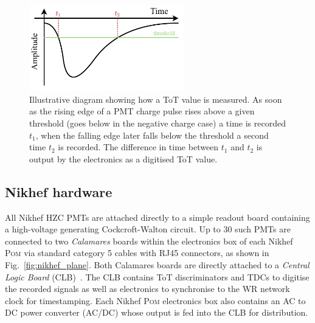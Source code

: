 \begin{figure} %
    \includegraphics[width=0.6\textwidth]{diagrams/5-daq/tot.pdf}
    \caption[Illustrative diagram showing how Time over Threshold is measured.]
    {Illustrative diagram showing how a ToT value is measured. As soon as the rising edge of a PMT
        charge pulse rises above a given threshold (goes below in the negative charge case) a time
        is recorded $t_{1}$, when the falling edge later falls below the threshold a second time
        $t_{2}$ is recorded. The difference in time between $t_{1}$ and $t_{2}$ is output by the
        electronics as a digitised ToT value.}
    \label{fig:tot}
\end{figure}

\subsection{Nikhef hardware} %
\label{sec:daq_hard_Nikhed} %

All Nikhef HZC PMTs are attached directly to a simple readout board containing a high-voltage
generating Cockcroft-Walton circuit. Up to 30 such PMTs are connected to two \emph{Calamares}
boards within the electronics box of each Nikhef \textsc{Pom} via standard category 5 cables with
RJ45 connectors, as shown in Fig.~\ref{fig:nikhef_plane}. Both Calamares boards are directly
attached to a \emph{Central Logic Board} (CLB)~\cite{biagi2015, eijk2015}. The CLB contains ToT
discriminators and TDCs to digitise the recorded signals as well as electronics to synchronise to
the WR network clock for timestamping. Each Nikhef \textsc{Pom} electronics box also contains an
AC to DC power converter (AC/DC) whose output is fed into the CLB for distribution.

